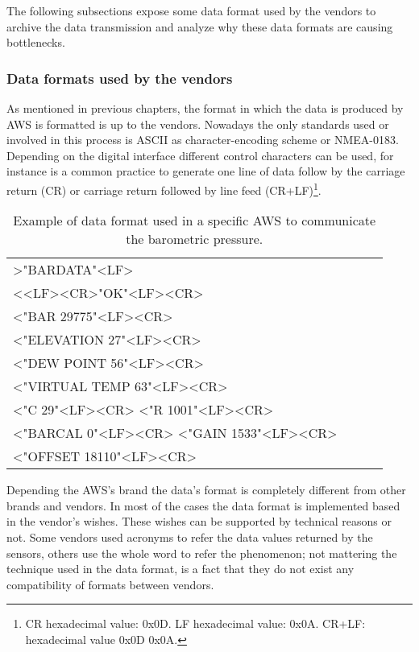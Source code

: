 The following subsections expose some data format used by the vendors to archive the data transmission and analyze why these data formats are causing bottlenecks.

\subsubsection{Data formats used by the vendors}

As mentioned in previous chapters, the format in which the data is produced by \gls{AWS} is formatted is up to the vendors. Nowadays the only standards used or involved in this process is \gls{ASCII} as character-encoding scheme or \gls{NMEA-0183}. Depending on the digital interface different control characters can be used, for instance is a common practice to generate one line of data follow by the carriage return (CR) or carriage return followed by line feed (CR+LF)\footnote{CR hexadecimal value: 0x0D. LF hexadecimal value: 0x0A. CR+LF: hexadecimal value 0x0D 0x0A.}.

\begin{table}[hc]
\centering

    \begin{tabular}{ | l | l | l | l |}
    \hline    
>"BARDATA"<LF>\\
<<LF><CR>"OK"<LF><CR>\\
<"BAR 29775"<LF><CR>\\
<"ELEVATION 27"<LF><CR>\\ 
<"DEW POINT 56"<LF><CR>\\ 
<"VIRTUAL TEMP 63"<LF><CR> \\
<"C 29"<LF><CR> <"R 1001"<LF><CR>\\
<"BARCAL 0"<LF><CR> <"GAIN 1533"<LF><CR> \\
<"OFFSET 18110"<LF><CR>\\
\hline
\end{tabular}
\caption{Example of data format used in a specific AWS to communicate the barometric pressure.}
\end{table}

Depending the \gls{AWS}'s brand the data's format is completely different from other brands and vendors. In most of the cases the data format is implemented based in the vendor's wishes. These wishes can be supported by technical reasons or not. Some vendors used acronyms to refer the data values returned by the sensors, others use the whole word to refer the phenomenon; not mattering the technique used in the data format, is a fact that they do not exist any compatibility of formats between vendors.

